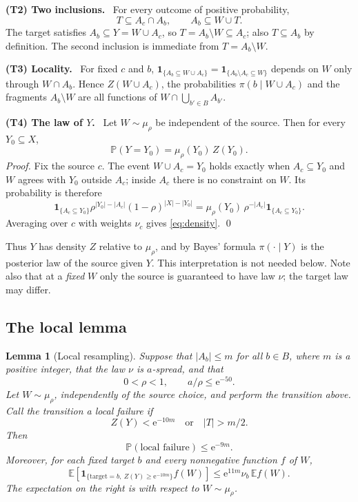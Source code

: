 \documentclass[11pt]{article}
\newtheorem{lemma}[theorem]{Lemma}
\numberwithin{equation}{section}
\theoremstyle{remark}
\newcommand{\PP}{\mathbb P}
\newcommand{\EE}{\mathbb E}
\newcommand{\ind}{\mathbf 1}
\newcommand{\ee}{\mathrm e}
\newcommand{\step}[1]{\par\medskip\noindent\textbf{#1}\ }
\begin{document}
\step{(T2) Two inclusions.} For every outcome of positive probability,
\begin{equation}\label{eq:two-inclusions}
 T\subseteq A_c\cap A_b,
 \qquad A_b\subseteq W\cup T.
\end{equation}
The target satisfies $A_b\subseteq Y=W\cup A_c$, so
$T=A_b\setminus W\subseteq A_c$; also $T\subseteq A_b$ by definition.
The second inclusion is immediate from $T=A_b\setminus W$.

\step{(T3) Locality.} For fixed $c$ and $b$,
$\ind_{\{A_b\subseteq W\cup A_c\}}=\ind_{\{A_b\setminus A_c\subseteq W\}}$
depends on $W$ only through $W\cap A_b$. Hence $Z(W\cup A_c)$, the
probabilities $\pi(b\mid W\cup A_c)$ and the fragments $A_b\setminus W$
are all functions of $W\cap\bigcup_{b'\in B}A_{b'}$.

\step{(T4) The law of $Y$.} Let $W\sim\mu_\rho$ be independent of the
source. Then for every $Y_0\subseteq X$,
\begin{equation}\label{eq:density}
 \PP(Y=Y_0)=\mu_\rho(Y_0)\,Z(Y_0).
\end{equation}
\emph{Proof.} Fix the source $c$. The event $W\cup A_c=Y_0$ holds
exactly when $A_c\subseteq Y_0$ and $W$ agrees with $Y_0$ outside $A_c$;
inside $A_c$ there is no constraint on $W$. Its probability is
therefore
\[
 \ind_{\{A_c\subseteq Y_0\}}\rho^{|Y_0|-|A_c|}(1-\rho)^{|X|-|Y_0|}
 =\mu_\rho(Y_0)\,\rho^{-|A_c|}\ind_{\{A_c\subseteq Y_0\}}.
\]
Averaging over $c$ with weights $\nu_c$ gives \eqref{eq:density}.
\qed

\medskip
Thus $Y$ has density $Z$ relative to $\mu_\rho$, and by Bayes' formula
$\pi(\cdot\mid Y)$ is the posterior law of the source given $Y$. This
interpretation is not needed below. Note also that at a \emph{fixed} $W$
only the source is guaranteed to have law $\nu$; the target law may
differ.

\subsection{The local lemma}

\begin{lemma}[Local resampling]\label{lem:local}
Suppose that $|A_b|\le m$ for all $b\in B$, where $m$ is a positive
integer, that the law $\nu$ is $a$-spread, and that
\[
 0<\rho<1,\qquad a/\rho\le\ee^{-50}.
\]
Let $W\sim\mu_\rho$, independently of the source choice, and perform the
transition above. Call the transition a \emph{local failure} if
\[
 Z(Y)<\ee^{-10m}\quad\text{or}\quad |T|>m/2.
\]
Then
\begin{equation}\label{eq:local-failure}
 \PP(\text{local failure})\le\ee^{-9m}.
\end{equation}
Moreover, for each fixed target $b$ and every nonnegative function $f$
of $W$,
\begin{equation}\label{eq:distortion}
 \EE\!\left[
  \ind_{\{\mathrm{target}=b,\ Z(Y)\ge\ee^{-10m}\}} f(W)
 \right]
 \le \ee^{11m}\nu_b\,\EE f(W).
\end{equation}
The expectation on the right is with respect to $W\sim\mu_\rho$.
\end{lemma}
\end{document}
